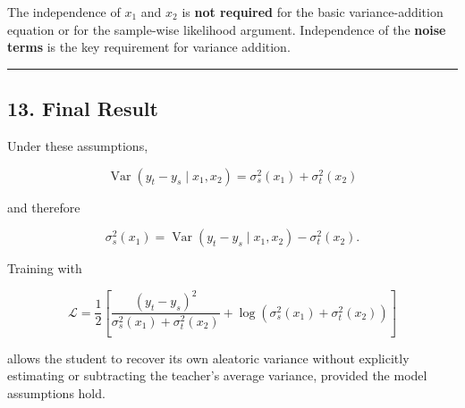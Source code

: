 The independence of \(x_1\) and \(x_2\) is \textbf{not required} for the
basic variance-addition equation or for the sample-wise likelihood
argument. Independence of the \textbf{noise terms} is the key
requirement for variance addition.

\begin{center}\rule{0.5\linewidth}{0.5pt}\end{center}

\subsection{13. Final Result}\label{final-result}

Under these assumptions,

\[
\boxed{
\operatorname{Var}(y_t-y_s\mid x_1,x_2)
=
\sigma_s^2(x_1)+\sigma_t^2(x_2)
}
\]

and therefore

\[
\boxed{
\sigma_s^2(x_1)
=
\operatorname{Var}(y_t-y_s\mid x_1,x_2)
-
\sigma_t^2(x_2).
}
\]

Training with

\[
\boxed{
\mathcal L
=
\frac12
\left[
\frac{(y_t-y_s)^2}
{\sigma_s^2(x_1)+\sigma_t^2(x_2)}
+
\log\left(\sigma_s^2(x_1)+\sigma_t^2(x_2)\right)
\right]
}
\]

allows the student to recover its own aleatoric variance without
explicitly estimating or subtracting the teacher's average variance,
provided the model assumptions hold.